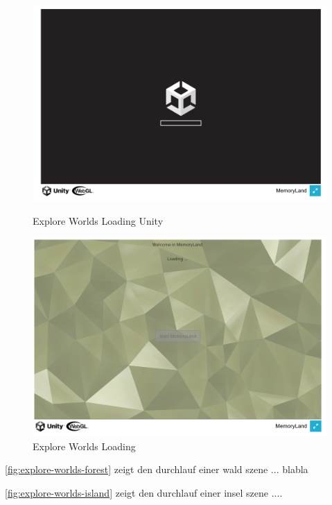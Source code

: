 \begin{figure} [h t]
    \centering
    \includegraphics[scale=0.5]{pics/explore_worlds_loading_unity.PNG}
    \caption{Explore Worlds Loading Unity}
    \label{fig:explore-worlds-loading-unity}

    \vspace{1cm}

    \centering
    \includegraphics[scale=0.5]{pics/explore_worlds_loading.PNG}
    \caption{Explore Worlds Loading}
    \label{fig:explore-worlds-loading}
\end{figure}


\ref{fig:explore-worlds-forest} zeigt den durchlauf einer wald szene ... blabla


\ref{fig:explore-worlds-island} zeigt den durchlauf einer insel szene ....


